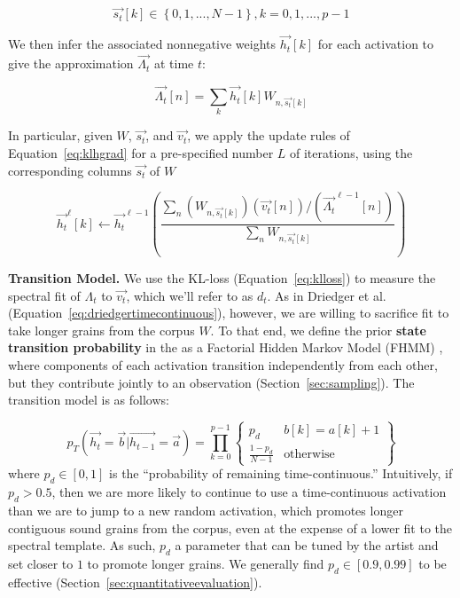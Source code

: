 \documentclass{article}
\begin{document}
    \begin{equation} 
        \label{eq:statevector}
        \vec{s_t}[k] \in \left\{0, 1, ..., N-1\right\}, k = 0, 1, ..., p-1 
    \end{equation}

    We then infer the associated nonnegative weights $\vec{h_t}[k]$ for each activation to give the approximation $\vec{\Lambda_t}$ at time $t$:
    
    \begin{equation}
        \label{eq:approximation}
        \vec{\Lambda_t}[n] = \sum_{k} \vec{h_t}[k]  W_{n, \vec{s_t}[k]}
    \end{equation}

    In particular, given $W$, $\vec{s_t}$, and $\vec{v_t}$, we apply the update rules of Equation~\ref{eq:klhgrad} for a pre-specified number $L$ of iterations, using the corresponding columns $\vec{s_t}$ of $W$

    \begin{equation}
        \label{eq:sparseklhgrad}
        \vec{h_t}^{\ell}[k]  \gets \vec{h_t}^{\ell-1} \left(  \frac{\sum_n (W_{n, \vec{s_t}[k]}) (\vec{v_t}[n]) / (\vec{\Lambda_t}^{\ell-1}[n]) }{ \sum_{n} W_{n, \vec{s_t}[k]}} \right)
    \end{equation}
    

    \textbf{Transition Model.} We use the KL-loss (Equation~\ref{eq:klloss}) to measure the spectral fit of $\Lambda_t$ to $\vec{v_t}$, which we'll refer to as $d_t$.  As in Driedger et al. \cite{driedger2015let} (Equation~\ref{eq:driedgertimecontinuous}), however, we are willing to sacrifice fit to take longer grains from the corpus $W$.  To that end, we define the prior  \textbf{state transition probability} in the as a Factorial Hidden Markov Model (FHMM) \cite{ghahramani1995factorial}, where components of each activation transition independently from each other, but they contribute jointly to an observation (Section~\ref{sec:sampling}).  The transition model is as follows:

    \begin{equation}
        \label{eq:transitionprob}
        p_T(\vec{h_t} = \vec{b} | \vec{h_{t-1}} = \vec{a}) = \prod_{k=0}^{p-1} \left\{  \begin{array}{cc}  p_d & b[k] = a[k]+1  \\ \frac{1-p_d}{N-1} & \text{otherwise} \end{array} \right\}
    \end{equation}
    where $p_d \in [0, 1]$ is the ``probability of remaining time-continuous.''  Intuitively, if $p_d > 0.5$, then we are more likely to continue to use a time-continuous activation than we are to jump to a new random activation, which promotes longer contiguous sound grains from the corpus, even at the expense of a lower fit to the spectral template.  As such, $p_d$ a parameter that can be tuned by the artist and set closer to $1$ to promote longer grains.  We generally find $p_d \in [0.9, 0.99]$ to be effective (Section~\ref{sec:quantitativeevaluation}).
\end{document}
